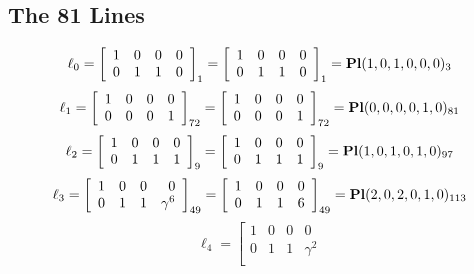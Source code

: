 \documentclass{article}
\begin{document}
{\subsection*{The 81 Lines}
$$
\ell_{0} = 
\left[
\begin{array}{*{4}{r}}
1 & 0 & 0 & 0\\
0 & 1 & 1 & 0\\
\end{array}
\right]
_{1}
=
\left[
\begin{array}{*{4}c}
1  & 0  & 0  & 0\\
0  & 1  & 1  & 0\\
\end{array}
\right]_{1}
={\rm\bf Pl}(1,0,1,0,0,0 )_{3}$$
$$
\ell_{1} = 
\left[
\begin{array}{*{4}{r}}
1 & 0 & 0 & 0\\
0 & 0 & 0 & 1\\
\end{array}
\right]
_{72}
=
\left[
\begin{array}{*{4}c}
1  & 0  & 0  & 0\\
0  & 0  & 0  & 1\\
\end{array}
\right]_{72}
={\rm\bf Pl}(0,0,0,0,1,0 )_{81}$$
$$
\ell_{2} = 
\left[
\begin{array}{*{4}{r}}
1 & 0 & 0 & 0\\
0 & 1 & 1 & 1\\
\end{array}
\right]
_{9}
=
\left[
\begin{array}{*{4}c}
1  & 0  & 0  & 0\\
0  & 1  & 1  & 1\\
\end{array}
\right]_{9}
={\rm\bf Pl}(1,0,1,0,1,0 )_{97}$$
$$
\ell_{3} = 
\left[
\begin{array}{*{4}{r}}
1 & 0 & 0 & 0\\
0 & 1 & 1 & \gamma^{6}\\
\end{array}
\right]
_{49}
=
\left[
\begin{array}{*{4}c}
1  & 0  & 0  & 0\\
0  & 1  & 1  & 6\\
\end{array}
\right]_{49}
={\rm\bf Pl}(2,0,2,0,1,0 )_{113}$$
$$
\ell_{4} = 
\left[
\begin{array}{*{4}{r}}
1 & 0 & 0 & 0\\
0 & 1 & 1 & \gamma^{2}\\
\end{array}
$$}
\end{document}
